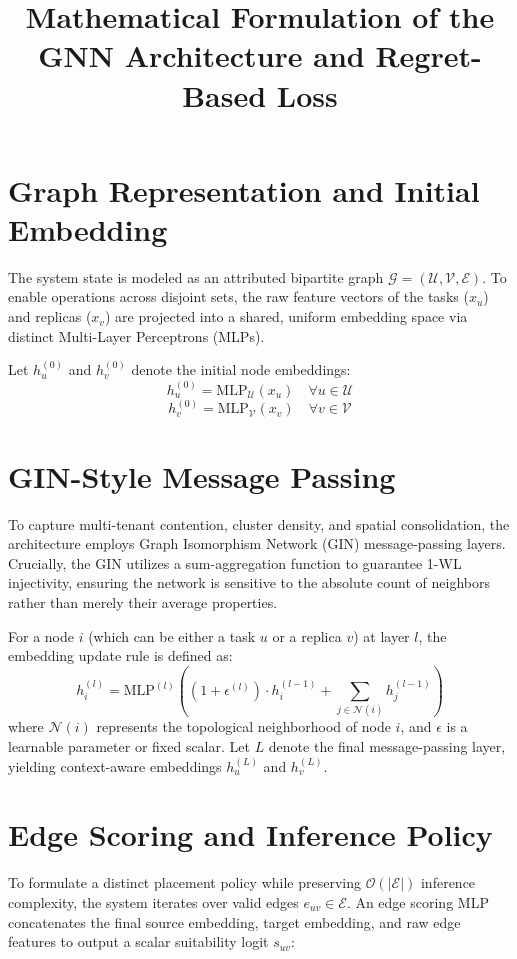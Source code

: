 \documentclass[11pt]{article}
\title{Mathematical Formulation of the GNN Architecture and Regret-Based Loss}
\author{}
\date{}
\begin{document}
\maketitle

\section{Graph Representation and Initial Embedding}
The system state is modeled as an attributed bipartite graph $\mathcal{G} = (\mathcal{U}, \mathcal{V}, \mathcal{E})$. To enable operations across disjoint sets, the raw feature vectors of the tasks ($x_u$) and replicas ($x_v$) are projected into a shared, uniform embedding space via distinct Multi-Layer Perceptrons (MLPs).

Let $h_u^{(0)}$ and $h_v^{(0)}$ denote the initial node embeddings:
\begin{equation}
h_u^{(0)} = \text{MLP}_{\mathcal{U}}(x_u) \quad \forall u \in \mathcal{U}
\end{equation}
\begin{equation}
h_v^{(0)} = \text{MLP}_{\mathcal{V}}(x_v) \quad \forall v \in \mathcal{V}
\end{equation}

\section{GIN-Style Message Passing}
To capture multi-tenant contention, cluster density, and spatial consolidation, the architecture employs Graph Isomorphism Network (GIN) message-passing layers. Crucially, the GIN utilizes a sum-aggregation function to guarantee 1-WL injectivity, ensuring the network is sensitive to the absolute count of neighbors rather than merely their average properties.

For a node $i$ (which can be either a task $u$ or a replica $v$) at layer $l$, the embedding update rule is defined as:
\begin{equation}
h_i^{(l)} = \text{MLP}^{(l)} \left( (1 + \epsilon^{(l)}) \cdot h_i^{(l-1)} + \sum_{j \in \mathcal{N}(i)} h_j^{(l-1)} \right)
\end{equation}
where $\mathcal{N}(i)$ represents the topological neighborhood of node $i$, and $\epsilon$ is a learnable parameter or fixed scalar. Let $L$ denote the final message-passing layer, yielding context-aware embeddings $h_u^{(L)}$ and $h_v^{(L)}$.

\section{Edge Scoring and Inference Policy}
To formulate a distinct placement policy while preserving $\mathcal{O}(|\mathcal{E}|)$ inference complexity, the system iterates over valid edges $e_{uv} \in \mathcal{E}$. An edge scoring MLP concatenates the final source embedding, target embedding, and raw edge features to output a scalar suitability logit $s_{uv}$:
\end{document}
